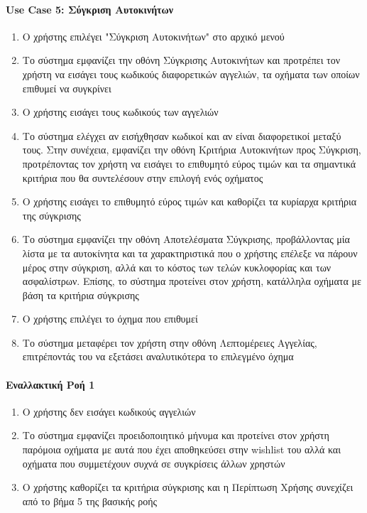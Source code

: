 \documentclass{../ol-softwaremanual}
\begin{document}
	\paragraph{\en Use Case 5: \gr Σύγκριση Αυτοκινήτων}
	\begin{enumerate}
		\item Ο χρήστης επιλέγει \en"\gr Σύγκριση Αυτοκινήτων\en" \gr στο αρχικό μενού
		\item Το σύστημα εμφανίζει την οθόνη Σύγκρισης Αυτοκινήτων και προτρέπει τον χρήστη να εισάγει τους κωδικούς διαφορετικών αγγελιών, τα οχήματα των οποίων επιθυμεί να συγκρίνει
		\item Ο χρήστης εισάγει τους κωδικούς των αγγελιών
		\item Το σύστημα ελέγχει αν εισήχθησαν κωδικοί και αν είναι διαφορετικοί μεταξύ τους. Στην συνέχεια, εμφανίζει την οθόνη Κριτήρια Αυτοκινήτων προς Σύγκριση, προτρέποντας τον χρήστη να εισάγει το επιθυμητό εύρος τιμών και τα σημαντικά κριτήρια που θα συντελέσουν στην επιλογή ενός οχήματος
		\item Ο χρήστης εισάγει το επιθυμητό εύρος τιμών και καθορίζει τα κυρίαρχα κριτήρια της σύγκρισης
		\item Το σύστημα εμφανίζει την οθόνη Αποτελέσματα Σύγκρισης, προβάλλοντας μία λίστα με τα αυτοκίνητα και τα χαρακτηριστικά που ο χρήστης επέλεξε να πάρουν μέρος στην σύγκριση, αλλά και το κόστος των τελών κυκλοφορίας και των ασφαλίστρων. Επίσης, το σύστημα προτείνει στον χρήστη, κατάλληλα οχήματα με βάση τα κριτήρια σύγκρισης
		\item Ο χρήστης επιλέγει το όχημα που επιθυμεί
		\item Το σύστημα μεταφέρει τον χρήστη στην οθόνη Λεπτομέρειες Αγγελίας, επιτρέποντάς του να εξετάσει αναλυτικότερα το επιλεγμένο όχημα
	\end{enumerate}
	
	\paragraph{Εναλλακτική Ροή 1}
	
	\begin{enumerate}
		\item Ο χρήστης δεν εισάγει κωδικούς αγγελιών 
		\item Το σύστημα εμφανίζει προειδοποιητικό μήνυμα και προτείνει στον χρήστη παρόμοια οχήματα με αυτά που έχει αποθηκεύσει στην \en wishlist \gr του αλλά και οχήματα που συμμετέχουν συχνά σε συγκρίσεις άλλων χρηστών
		\item Ο χρήστης καθορίζει τα κριτήρια σύγκρισης και η Περίπτωση Χρήσης συνεχίζει από το βήμα 5 της βασικής ροής
	\end{enumerate}
\end{document}
